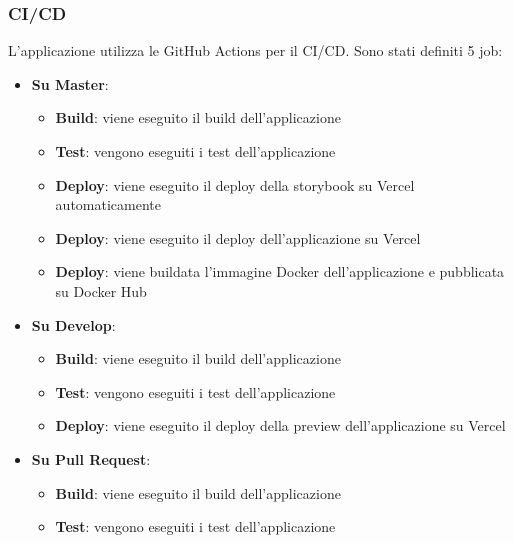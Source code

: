 \documentclass[8pt]{beamer}
\begin{document}
\begin{frame}
    \frametitle{CI/CD}
    L'applicazione utilizza le GitHub Actions per il CI/CD.
    Sono stati definiti 5 job:
    \begin{itemize}
        \item \textbf{Su Master}:
        \begin{itemize}
            \item \textbf{Build}: viene eseguito il build dell'applicazione
            \item \textbf{Test}: vengono eseguiti i test dell'applicazione
            \item \textbf{Deploy}: viene eseguito il deploy della storybook su Vercel automaticamente
            \item \textbf{Deploy}: viene eseguito il deploy dell'applicazione su Vercel
            \item \textbf{Deploy}: viene buildata l'immagine Docker dell'applicazione e pubblicata su Docker Hub
        \end{itemize}
        \item \textbf{Su Develop}:
        \begin{itemize}
            \item \textbf{Build}: viene eseguito il build dell'applicazione
            \item \textbf{Test}: vengono eseguiti i test dell'applicazione
            \item \textbf{Deploy}: viene eseguito il deploy della preview dell'applicazione su Vercel
        \end{itemize}
        \item \textbf{Su Pull Request}:
        \begin{itemize}
            \item \textbf{Build}: viene eseguito il build dell'applicazione
            \item \textbf{Test}: vengono eseguiti i test dell'applicazione
        \end{itemize}
    \end{itemize}
\end{frame}
\end{document}

